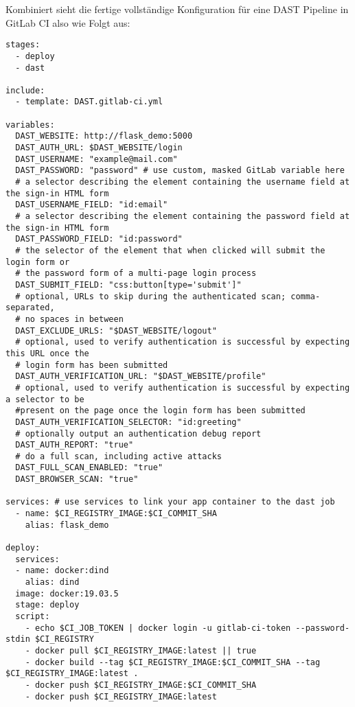 Kombiniert sieht die fertige vollständige Konfiguration für eine DAST Pipeline in GitLab CI also wie Folgt aus:
\begin{verbatim}
stages:
  - deploy
  - dast

include:
  - template: DAST.gitlab-ci.yml

variables:
  DAST_WEBSITE: http://flask_demo:5000
  DAST_AUTH_URL: $DAST_WEBSITE/login
  DAST_USERNAME: "example@mail.com"
  DAST_PASSWORD: "password" # use custom, masked GitLab variable here
  # a selector describing the element containing the username field at the sign-in HTML form
  DAST_USERNAME_FIELD: "id:email"
  # a selector describing the element containing the password field at the sign-in HTML form
  DAST_PASSWORD_FIELD: "id:password"
  # the selector of the element that when clicked will submit the login form or
  # the password form of a multi-page login process
  DAST_SUBMIT_FIELD: "css:button[type='submit']"
  # optional, URLs to skip during the authenticated scan; comma-separated,
  # no spaces in between
  DAST_EXCLUDE_URLS: "$DAST_WEBSITE/logout"
  # optional, used to verify authentication is successful by expecting this URL once the
  # login form has been submitted
  DAST_AUTH_VERIFICATION_URL: "$DAST_WEBSITE/profile"
  # optional, used to verify authentication is successful by expecting a selector to be
  #present on the page once the login form has been submitted
  DAST_AUTH_VERIFICATION_SELECTOR: "id:greeting"
  # optionally output an authentication debug report
  DAST_AUTH_REPORT: "true"
  # do a full scan, including active attacks
  DAST_FULL_SCAN_ENABLED: "true"
  DAST_BROWSER_SCAN: "true"

services: # use services to link your app container to the dast job
  - name: $CI_REGISTRY_IMAGE:$CI_COMMIT_SHA
    alias: flask_demo

deploy:
  services:
  - name: docker:dind
    alias: dind
  image: docker:19.03.5
  stage: deploy
  script:
    - echo $CI_JOB_TOKEN | docker login -u gitlab-ci-token --password-stdin $CI_REGISTRY
    - docker pull $CI_REGISTRY_IMAGE:latest || true
    - docker build --tag $CI_REGISTRY_IMAGE:$CI_COMMIT_SHA --tag $CI_REGISTRY_IMAGE:latest .
    - docker push $CI_REGISTRY_IMAGE:$CI_COMMIT_SHA
    - docker push $CI_REGISTRY_IMAGE:latest
\end{verbatim}
